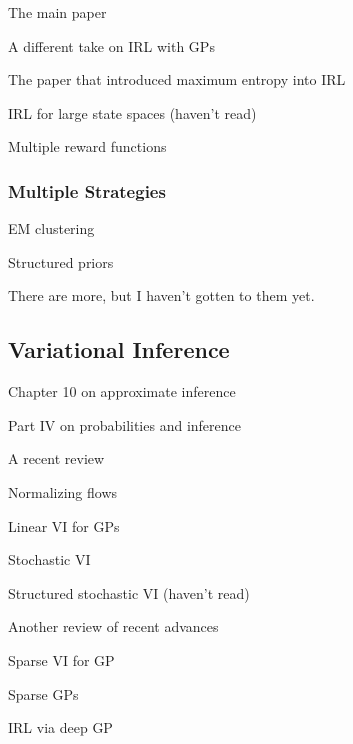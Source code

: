 \documentclass{mprop}
\begin{document}
The main paper \cite{DBLP:conf/nips/LevinePK11}

A different take on IRL with GPs \cite{DBLP:journals/corr/abs-1208-2112}

The paper that introduced maximum entropy into IRL \cite{ziebart2008maximum}

IRL for large state spaces (haven't read) \cite{DBLP:journals/jmlr/BoulariasKP11}

Multiple reward functions \cite{DBLP:conf/nips/ChoiK12}

\subsubsection{Multiple Strategies}

EM clustering \cite{DBLP:conf/icml/BabesMLS11}

Structured priors \cite{DBLP:conf/ewrl/DimitrakakisR11}

There are more, but I haven't gotten to them yet.

\subsection{Variational Inference}

Chapter 10 on approximate inference \cite{DBLP:books/lib/Bishop07}

Part IV on probabilities and inference \cite{MacKay:2002:ITI:971143}

A recent review \cite{blei2017variational}

Normalizing flows \cite{DBLP:conf/icml/RezendeM15}

Linear VI for GPs \cite{DBLP:conf/nips/ChengB17}

Stochastic VI \cite{DBLP:journals/jmlr/HoffmanBWP13}

Structured stochastic VI (haven't read) \cite{DBLP:conf/aistats/HoffmanB15}

Another review of recent advances \cite{DBLP:journals/corr/abs-1711-05597}

Sparse VI for GP \cite{DBLP:journals/jmlr/HensmanDS17}

Sparse GPs \cite{DBLP:journals/jmlr/CandelaR05}

IRL via deep GP \cite{DBLP:conf/uai/JinDAS17}



\end{document}
